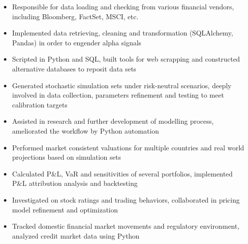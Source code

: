 \documentclass{resume}
\begin{document}
    \begin{itemize}
        \item Responsible for data loading and checking from various financial vendors, including Bloomberg, FactSet, MSCI, etc.
        \item Implemented data retrieving, cleaning and transformation (SQLAlchemy, Pandas) in order to engender alpha signals
        \item Scripted in Python and SQL, built tools for web scrapping and constructed alternative databases to reposit data sets
    \end{itemize}
    \begin{itemize}
        \item Generated stochastic simulation sets under risk-neutral scenarios, deeply involved in data collection, parameters refinement and testing to meet calibration targets
        \item Assisted in research and further development of modelling process, ameliorated the workflow by Python automation
        \item Performed market consistent valuations for multiple countries and real world projections based on simulation sets
    \end{itemize}
    \begin{itemize}
        \item Calculated P\&L, VaR and sensitivities of several portfolios, implemented P\&L attribution analysis and backtesting
        \item Investigated on stock ratings and trading behaviors, collaborated in pricing model refinement and optimization
        \item Tracked domestic financial market movements and regulatory environment, analyzed credit market data using Python
    \end{itemize}
\end{document}
